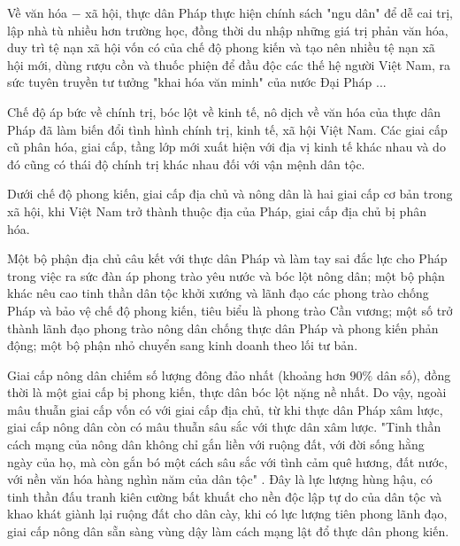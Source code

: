 Về văn hóa $-$ xã hội, thực dân Pháp thực hiện chính sách "ngu dân" để dễ cai trị, lập nhà tù nhiều hơn trường học, đồng thời du nhập những giá trị phản văn hóa, duy trì tệ nạn xã hội vốn có của chế độ phong kiến và tạo nên nhiều tệ nạn xã hội mới, dùng rượu cồn và thuốc phiện để đầu độc các thế hệ người Việt Nam, ra sức tuyên truyền tư tưởng "khai hóa văn minh" của nước Đại Pháp ...

Chế độ áp bức về chính trị, bóc lột về kinh tế, nô dịch về văn hóa của thực dân Pháp đã làm biến đổi tình hình chính trị, kinh tế, xã hội Việt Nam. Các giai cấp cũ phân hóa, giai cấp, tầng lớp mới xuất hiện với địa vị kinh tế khác nhau và do đó cũng có thái độ chính trị khác nhau đối với vận mệnh dân tộc.

Dưới chế độ phong kiến, giai cấp địa chủ và nông dân là hai giai cấp cơ bản trong xã hội, khi Việt Nam trở thành thuộc địa của Pháp, giai cấp địa chủ bị phân hóa.

Một bộ phận địa chủ câu kết với thực dân Pháp và làm tay sai đắc lực cho Pháp trong việc ra sức đàn áp phong trào yêu nước và bóc lột nông dân; một bộ phận khác nêu cao tinh thần dân tộc khởi xướng và lãnh đạo các phong trào chống Pháp và bảo vệ chế độ phong kiến, tiêu biểu là phong trào Cần vương; một số trở thành lãnh đạo phong trào nông dân chống thực dân Pháp và phong kiến phản động; một bộ phận nhỏ chuyển sang kinh doanh theo lối tư bản.

Giai cấp nông dân chiếm số lượng đông đảo nhất (khoảng hơn $90\%$ dân số), đồng thời là một giai cấp bị phong kiến, thực dân bóc lột nặng nề nhất. Do vậy, ngoài mâu thuẫn giai cấp vốn có với giai cấp địa chủ, từ khi thực dân Pháp xâm lược, giai cấp nông dân còn có mâu thuẫn sâu sắc với thực dân xâm lược. "Tinh thần cách mạng của nông dân không chỉ gắn liền với ruộng đất, với đời sống hằng ngày của họ, mà còn gắn bó một cách sâu sắc với tình cảm quê hương, đất nước, với nền văn hóa hàng nghìn năm của dân tộc" . Đây là lực lượng hùng hậu, có tinh thần đấu tranh kiên cường bất khuất cho nền độc lập tự do của dân tộc và khao khát giành lại ruộng đất cho dân cày, khi có lực lượng tiên phong lãnh đạo, giai cấp nông dân sẵn sàng vùng dậy làm cách mạng lật đổ thực dân phong kiến.